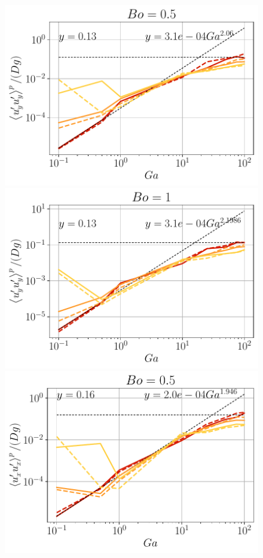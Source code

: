 \begin{figure}[h!]
    \centering
    \includegraphics[height=0.20\textheight]{image/N_10/UU/UU_pyy_Bo_0_5.pdf}
    \includegraphics[height=0.20\textheight]{image/N_10/UU/UU_pyy_Bo_1.pdf}
    \includegraphics[height=0.20\textheight]{image/N_10/UU/UU_pxx_Bo_0_5.pdf}

\end{figure}
